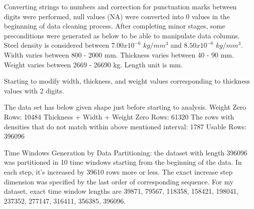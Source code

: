 \documentclass{article}
\begin{document}
Converting strings to numbers and correction for punctuation marks between digits were performed, null values (NA) were converted into $0$ values in the beginnning of data cleaning process. After completing minor stages, some preconditions were generated as below to be able to manipulate data columns.
Steel density is considered between $7.00 x 10^{-6}$ $kg/mm^{3}$ and $8.50x10^{-6}$ $kg/mm^{3}$.
Width varies between 800 - 2000 mm. 
Thickness varies between 40 - 90 mm. 
Weight varies between 2669 - 26690 kg.
Length unit is mm.

Starting to modify width, thickness, and weight values corresponding to thickness values with 2 digits.

The data set has below given shape just before starting to analysis.
Weight Zero Rows: 10484
Thickness + Width + Weight Zero Rows: 61320
The rows with densities that do not match within above mentioned interval: 1787
Usable Rows: 396096

Time Windows Generation by Data Partitioning:
the dataset with length 396096 was partitioned in 10 time windows starting from the beginning of the data. In each step, it's increased by 39610 rows more or less. The exact increase step dimension was specified by the last order of corresponding sequence. For my dataset, exact time window lengths are 39871, 79567, 118358, 158421, 198041, 237352, 277147, 316411, 356385, 396096.
\end{document}
